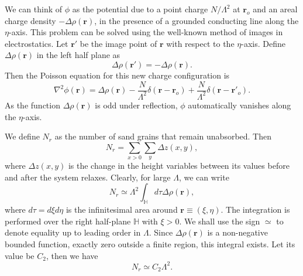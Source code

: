 \documentclass[11pt,a4paper]{book}
\begin{document}
We can think of $\phi$ as the potential due to a point charge $N/\Lambda^{2}$ at $\mathbf{r}_{o}$
and an areal charge density $-\Delta\rho\left( \mathbf{r} \right)$, in the presence
of a grounded conducting line along the $\eta$-axis. This problem can be solved
using the well-known method of images in electrostatics. Let $\mathbf{r}'$ be
the image point of $\mathbf{r}$ with respect to the $\eta$-axis.
Define $\Delta\rho\left( \mathbf{r} \right)$ in the left half plane as
\begin{equation}
\Delta\rho\left( \mathbf{r}' \right)=-\Delta\rho\left( \mathbf{r} \right).
\label{imden}
\end{equation}
Then the Poisson equation for this new charge configuration is
\begin{equation}
\nabla^2\phi(\mathbf{r})=\Delta\rho(\mathbf{r})-\frac{N}{\Lambda^2}\delta\left( \mathbf{r} - \mathbf{r}_{o} \right)+\frac{N}{\Lambda^2}\delta\left( \mathbf{r} - \mathbf{r'}_{o} \right).
\label{poisson4}
\end{equation}
As the function $\Delta\rho\left( \mathbf{r} \right)$ is odd under reflection,
$\phi$ automatically vanishes along the $\eta$-axis.

We define $N_{r}$ as the number of sand grains that remain unabsorbed. Then
\begin{equation}
N_{r}=\sum_{x>0}\sum_{y}\Delta z\left( x, y \right),
\label{nr1}
\end{equation}
where $\Delta z\left(x, y  \right)$ is the change in the height variables
between its values before and after the system relaxes. Clearly, for large $\Lambda$, we can
write
\begin{equation}
N_{r}\simeq\Lambda^{2}\int_{\mathbb{H}}d\tau\Delta\rho\left( \mathbf{r} \right),
\label{nr2}
\end{equation}
where $d\tau=d\xi d\eta$ is the infinitesimal area around $\mathbf{r}\equiv \left( \xi, \eta \right)$.
The integration is performed over the right half-plane $\mathbb{H}$ with $\xi>0$.
We shall use the sign $\simeq$ to denote equality up to leading order in $\Lambda$. 
Since $\Delta\rho\left( \mathbf{r} \right)$ is a non-negative bounded function,
exactly zero outside a finite region, this integral exists. Let its value be $C_{2}$, then we have
\begin{equation}
N_{r}\simeq C_{2}\Lambda^{2}.
\label{nr3}
\end{equation}
\end{document}
